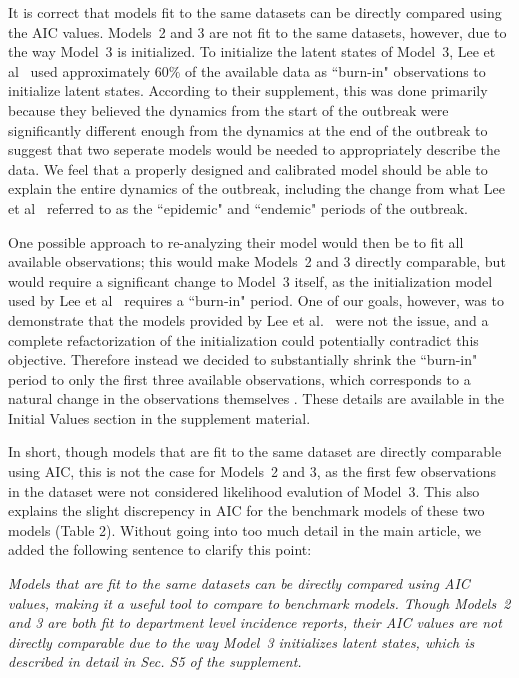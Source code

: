 \documentclass[11pt]{article}
\newcommand\article[1]{{\color{blue} \vspace{1mm}\hspace{0.25in}\parbox{6in}{\em #1}}}
\begin{document}
It is correct that models fit to the same datasets can be directly compared using the AIC values. Models~2 and 3 are not fit to the same datasets, however, due to the way Model~3 is initialized. To initialize the latent states of Model~3, Lee et al~\cite{lee20} used approximately $60\%$ of the available data as ``burn-in" observations to initialize latent states. According to their supplement, this was done primarily because they believed the dynamics from the start of the outbreak were significantly different enough from the dynamics at the end of the outbreak to suggest that two seperate models would be needed to appropriately describe the data. 
We feel that a properly designed and calibrated model should be able to explain the entire dynamics of the outbreak, including the change from what Lee et al~\cite{lee20} referred to as the ``epidemic" and ``endemic" periods of the outbreak. 

One possible approach to re-analyzing their model would then be to fit all available observations; this would make Models~2 and 3 directly comparable, but would require a significant change to Model~3 itself, as the initialization model used by Lee et al~\cite{lee20} requires a ``burn-in" period. One of our goals, however, was to demonstrate that the models provided by Lee et al.~\cite{lee20} were not the issue, and a complete refactorization of the initialization could potentially contradict this objective. Therefore instead we decided to substantially shrink the ``burn-in" period to only the first three available observations, which corresponds to a natural change in the observations themselves \cite{barzilay13}. These details are available in the Initial Values section in the supplement material.

In short, though models that are fit to the same dataset are directly comparable using AIC, this is not the case for Models~2 and 3, as the first few observations in the dataset were not considered likelihood evalution of Model~3. This also explains the slight discrepency in AIC for the benchmark models of these two models (Table 2). Without going into too much detail in the main article, we added the following sentence to clarify this point: 

\article{Models that are fit to the same datasets can be directly compared using AIC values, making it a useful tool to compare to benchmark models. Though Models~2 and 3 are both fit to department level incidence reports, their AIC values are not directly comparable due to the way Model~3 initializes latent states, which is described in detail in Sec. S5 of the supplement.}
\end{document}
